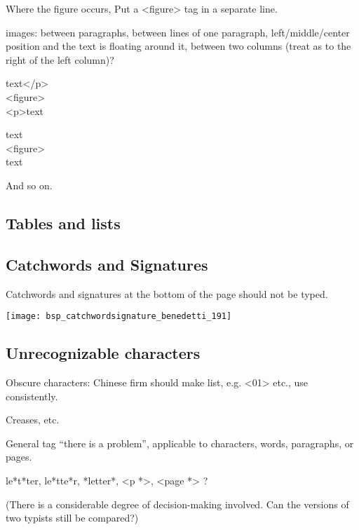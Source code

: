 Where the figure occurs, Put a <figure> tag in a separate line.

\begin{example}

images: between paragraphs, between lines of one paragraph, left/middle/center position and the text is floating around it, between two columns (treat as to the right of the left column)?

\begin{typeLatin}
text</p> \\
<figure> \\
<p>text
\end{typeLatin}

\begin{typeLatin}
text \\
<figure> \\
text 
\end{typeLatin}

And so on.
\end{example}


\subsection{Tables and lists}

\subsection{Catchwords and Signatures}

Catchwords and signatures at the bottom of the page should not be typed.

\begin{example}

\texttt{[image: bsp\_catchwordsignature\_benedetti\_191]} 

\end{example}


\subsection{Unrecognizable characters}

Obscure characters: Chinese firm should make list, e.g. <01> etc., use consistently.

Creases, etc.

General tag “there is a problem”, applicable to characters, words, paragraphs, or pages. 

le*t*ter, le*tte*r, *letter*, <p *>, <page *> ? 

(There is a considerable degree of decision-making involved. Can the versions of two typists still be compared?)


